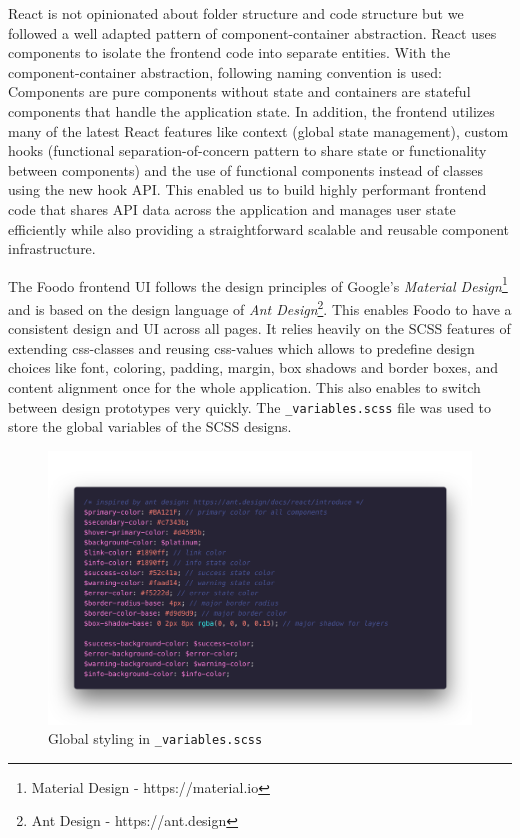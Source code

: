 React is not opinionated about folder structure and code structure but we followed a well adapted pattern of component-container abstraction. React uses components to isolate the frontend code into separate entities. With the component-container abstraction, following naming convention is used: Components are pure components without state and containers are stateful components that handle the application state. In addition, the frontend utilizes many of the latest React features like context (global state management), custom hooks (functional separation-of-concern pattern to share state or functionality between components) and the use of functional components instead of classes using the new hook API. This enabled us to build highly performant frontend code that shares API data across the application and manages user state efficiently while also providing a straightforward scalable and reusable component infrastructure. 


The Foodo frontend UI follows the design principles of Google’s \textit{Material Design}\footnote{Material Design - https://material.io} and is based on the design language of \textit{Ant Design}\footnote{Ant Design - https://ant.design}. This enables Foodo to have a consistent design and UI across all pages. It relies heavily on the SCSS features of extending css-classes and reusing css-values which allows to predefine design choices like font, coloring, padding, margin, box shadows and border boxes, and content alignment once for the whole application. This also enables to switch between design prototypes very quickly. The \texttt{\_variables.scss} file was used to store the global variables of the SCSS designs. 

\begin{figure}[ht]
	\captionsetup{justification=centering}
	\begin{center}
		\includegraphics[scale=0.25]{Ressourcen/img/code/scss.png}
		\vspace{-3em}
		\caption{Global styling in \texttt{\_variables.scss}}
	\end{center}
\end{figure}

